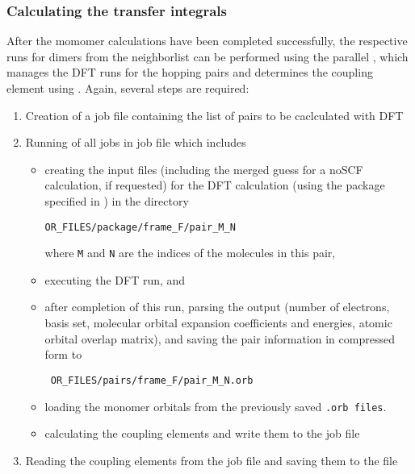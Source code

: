 \subsubsection{Calculating the transfer integrals}
\label{sec:idft}
After the momomer calculations have been completed successfully, the respective runs for dimers from the neighborlist can be performed using the parallel  \calculator, which manages the DFT runs for the hopping pairs and determines the coupling element using \dipro. Again, several steps are required:
\begin{enumerate}
\item Creation of a job file containing the list of pairs to be caclculated with DFT 
\item Running of all jobs in job file 
which includes
\begin{itemize}
\item creating the input files (including the merged guess for a noSCF calculation, if requested) for the DFT calculation (using the package specified in \xmloptions) in the directory 
\begin{verbatim}
OR_FILES/package/frame_F/pair_M_N
\end{verbatim}
where {\tt M} and {\tt N} are the indices of the molecules in this pair,
\item executing the DFT run, and
\item after completion of this run, parsing the output (number of electrons, basis set, molecular orbital expansion coefficients and energies, atomic orbital overlap matrix), and saving the pair information in compressed form to
\begin{verbatim}
 OR_FILES/pairs/frame_F/pair_M_N.orb 
\end{verbatim}
\item loading the monomer orbitals from the previously saved {\tt *.orb files}.
\item calculating the coupling elements and write them to the job file
\end{itemize}
\item Reading the coupling elements from the job file and saving them to the \sqlstate file
\end{enumerate}




